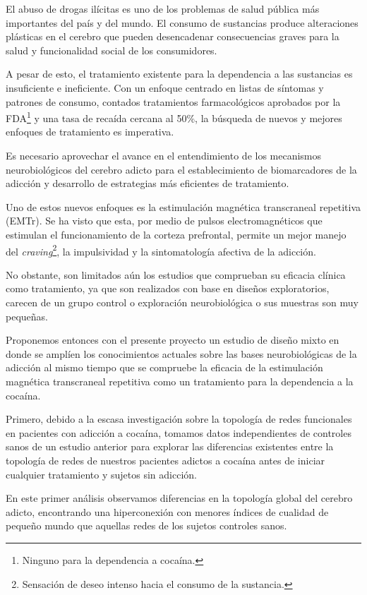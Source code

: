 El abuso de drogas ilícitas es uno de los problemas de salud pública más
importantes del país y del mundo.
El consumo de sustancias produce alteraciones plásticas en el
cerebro que pueden desencadenar consecuencias graves para la salud y funcionalidad
social de los consumidores. \par
A pesar de esto, el tratamiento existente para la dependencia a las sustancias es insuficiente e ineficiente.
Con un enfoque centrado en listas de síntomas y patrones de consumo, contados tratamientos farmacológicos aprobados por la FDA\footnote{Ninguno para la dependencia a cocaína.}
y una tasa de recaída cercana al 50\%, la búsqueda de nuevos y mejores enfoques de tratamiento es imperativa.\par
Es necesario aprovechar el avance en el entendimiento de los mecanismos neurobiológicos del cerebro adicto para el establecimiento de biomarcadores de la adicción y desarrollo de estrategias más eficientes de tratamiento.\par
Uno de estos nuevos enfoques es la estimulación magnética transcraneal repetitiva (EMTr). Se ha visto que esta, por medio de pulsos electromagnéticos que estimulan el funcionamiento de la corteza prefrontal, permite un mejor manejo del \textit{craving}\footnote{Sensación de deseo intenso hacia el consumo de la sustancia.}, la impulsividad y la sintomatología afectiva de la adicción. \par
No obstante, son limitados aún los estudios que comprueban su eficacia clínica como tratamiento, ya que son realizados con base en diseños exploratorios, carecen de un grupo control o exploración neurobiológica o sus muestras son muy pequeñas.\par
Proponemos entonces con el presente proyecto un estudio de diseño mixto en donde se amplíen los conocimientos actuales sobre las bases neurobiológicas de la adicción al mismo tiempo que se compruebe la eficacia de la estimulación magnética transcraneal repetitiva como un tratamiento para la dependencia a la cocaína.\par
Primero, debido a la escasa investigación sobre la topología de redes funcionales en pacientes con adicción a cocaína,  tomamos datos independientes de controles sanos de un estudio anterior para explorar las diferencias existentes entre la topología de redes de nuestros pacientes adictos a cocaína antes de iniciar cualquier tratamiento y sujetos sin adicción.\par
En este primer análisis observamos diferencias en la topología global del cerebro adicto, encontrando una hiperconexión con menores índices de cualidad de pequeño mundo que aquellas redes de los sujetos controles sanos.\par
